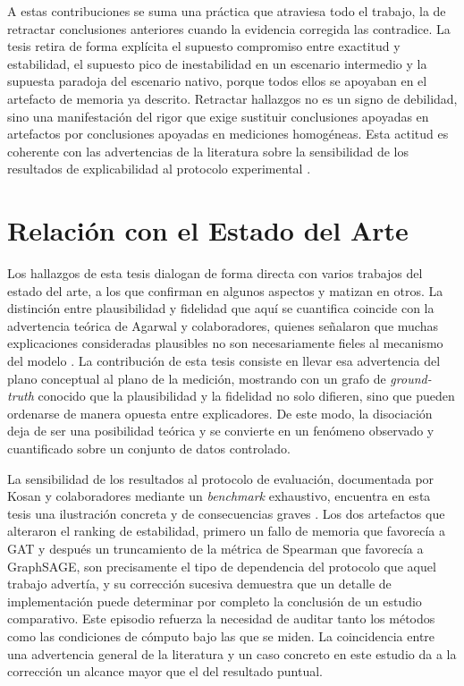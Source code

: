 A estas contribuciones se suma una práctica que atraviesa todo el trabajo, la de retractar conclusiones anteriores cuando la evidencia corregida las contradice. La tesis retira de forma explícita el supuesto compromiso entre exactitud y estabilidad, el supuesto pico de inestabilidad en un escenario intermedio y la supuesta paradoja del escenario nativo, porque todos ellos se apoyaban en el artefacto de memoria ya descrito. Retractar hallazgos no es un signo de debilidad, sino una manifestación del rigor que exige sustituir conclusiones apoyadas en artefactos por conclusiones apoyadas en mediciones homogéneas. Esta actitud es coherente con las advertencias de la literatura sobre la sensibilidad de los resultados de explicabilidad al protocolo experimental \cite{Kosan2023GNNX-BENCH:Benchmarking}.

\section{Relación con el Estado del Arte}

Los hallazgos de esta tesis dialogan de forma directa con varios trabajos del estado del arte, a los que confirman en algunos aspectos y matizan en otros. La distinción entre plausibilidad y fidelidad que aquí se cuantifica coincide con la advertencia teórica de Agarwal y colaboradores, quienes señalaron que muchas explicaciones consideradas plausibles no son necesariamente fieles al mecanismo del modelo \cite{Agarwal2022ProbingMethods}. La contribución de esta tesis consiste en llevar esa advertencia del plano conceptual al plano de la medición, mostrando con un grafo de \textit{ground-truth} conocido que la plausibilidad y la fidelidad no solo difieren, sino que pueden ordenarse de manera opuesta entre explicadores. De este modo, la disociación deja de ser una posibilidad teórica y se convierte en un fenómeno observado y cuantificado sobre un conjunto de datos controlado.

La sensibilidad de los resultados al protocolo de evaluación, documentada por Kosan y colaboradores mediante un \textit{benchmark} exhaustivo, encuentra en esta tesis una ilustración concreta y de consecuencias graves \cite{Kosan2023GNNX-BENCH:Benchmarking}. Los dos artefactos que alteraron el ranking de estabilidad, primero un fallo de memoria que favorecía a GAT y después un truncamiento de la métrica de Spearman que favorecía a GraphSAGE, son precisamente el tipo de dependencia del protocolo que aquel trabajo advertía, y su corrección sucesiva demuestra que un detalle de implementación puede determinar por completo la conclusión de un estudio comparativo. Este episodio refuerza la necesidad de auditar tanto los métodos como las condiciones de cómputo bajo las que se miden. La coincidencia entre una advertencia general de la literatura y un caso concreto en este estudio da a la corrección un alcance mayor que el del resultado puntual.

